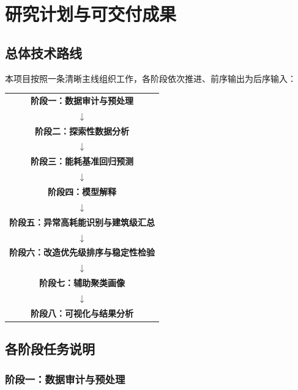 \section{研究计划与可交付成果}

\subsection{总体技术路线}

本项目按照一条清晰主线组织工作，各阶段依次推进、前序输出为后序输入：

\begin{center}
\begin{tabular}{c}
\hline
\textbf{阶段一：数据审计与预处理} \\
$\downarrow$ \\
\textbf{阶段二：探索性数据分析} \\
$\downarrow$ \\
\textbf{阶段三：能耗基准回归预测} \\
$\downarrow$ \\
\textbf{阶段四：模型解释} \\
$\downarrow$ \\
\textbf{阶段五：异常高耗能识别与建筑级汇总} \\
$\downarrow$ \\
\textbf{阶段六：改造优先级排序与稳定性检验} \\
$\downarrow$ \\
\textbf{阶段七：辅助聚类画像} \\
$\downarrow$ \\
\textbf{阶段八：可视化与结果分析} \\
\hline
\end{tabular}
\end{center}

\subsection{各阶段任务说明}

\subsubsection{阶段一：数据审计与预处理}

